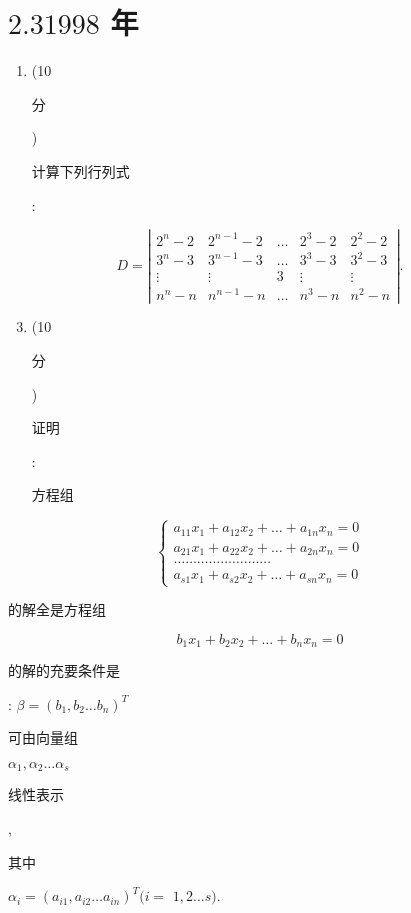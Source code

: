 \documentclass[10pt]{article}
\begin{document}
\section{$2.31998$ 年}
\begin{enumerate}
  \item (10 \begin{CJK}{UTF8}{mj}分\end{CJK}) \begin{CJK}{UTF8}{mj}计算下列行列式\end{CJK}:
\end{enumerate}
$$
D=\left|\begin{array}{ccccc}
2^{n}-2 & 2^{n-1}-2 & \ldots & 2^{3}-2 & 2^{2}-2 \\
3^{n}-3 & 3^{n-1}-3 & \ldots & 3^{3}-3 & 3^{2}-3 \\
\vdots & \vdots & 3 & \vdots & \vdots \\
n^{n}-n & n^{n-1}-n & \ldots & n^{3}-n & n^{2}-n
\end{array}\right| .
$$

\begin{enumerate}
  \setcounter{enumi}{2}
  \item (10 \begin{CJK}{UTF8}{mj}分\end{CJK}) \begin{CJK}{UTF8}{mj}证明\end{CJK}: \begin{CJK}{UTF8}{mj}方程组\end{CJK}
\end{enumerate}
$$
\left\{\begin{array}{l}
a_{11} x_{1}+a_{12} x_{2}+\ldots+a_{1 n} x_{n}=0 \\
a_{21} x_{1}+a_{22} x_{2}+\ldots+a_{2 n} x_{n}=0 \\
\ldots \ldots \ldots \ldots \ldots \ldots . \ldots \ldots \\
a_{s 1} x_{1}+a_{s 2} x_{2}+\ldots+a_{s n} x_{n}=0
\end{array}\right.
$$
\begin{CJK}{UTF8}{mj}的解全是方程组\end{CJK}
$$
b_{1} x_{1}+b_{2} x_{2}+\ldots+b_{n} x_{n}=0
$$
\begin{CJK}{UTF8}{mj}的解的充要条件是\end{CJK}: $\beta=\left(b_{1}, b_{2} \ldots b_{n}\right)^{T}$ \begin{CJK}{UTF8}{mj}可由向量组\end{CJK} $\alpha_{1}, \alpha_{2} \ldots \alpha_{s}$ \begin{CJK}{UTF8}{mj}线性表示\end{CJK}, \begin{CJK}{UTF8}{mj}其中\end{CJK} $\alpha_{i}=\left(a_{i 1}, a_{i 2} \ldots a_{i n}\right)^{T}(i=$ $1,2 \ldots s)$.
\end{document}
